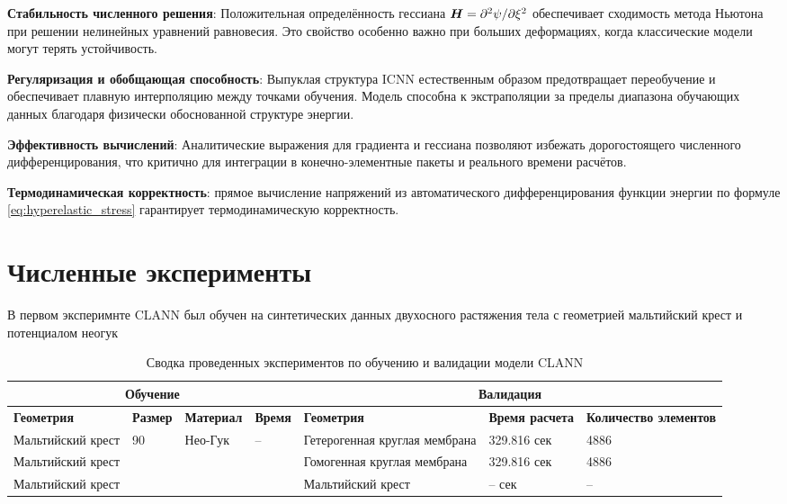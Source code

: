 \textbf{Стабильность численного решения}: Положительная определённость гессиана \(\boldsymbol{H} = \partial^2\psi/\partial\xi^2\) обеспечивает сходимость метода Ньютона при решении нелинейных уравнений равновесия. Это свойство особенно важно при больших деформациях, когда классические модели могут терять устойчивость.

\textbf{Регуляризация и обобщающая способность}: Выпуклая структура ICNN естественным образом предотвращает переобучение и обеспечивает плавную интерполяцию между точками обучения. Модель способна к экстраполяции за пределы диапазона обучающих данных благодаря физически обоснованной структуре энергии.

\textbf{Эффективность вычислений}: Аналитические выражения для градиента и гессиана позволяют избежать дорогостоящего численного дифференцирования, что критично для интеграции в конечно-элементные пакеты и реального времени расчётов.

\textbf{Термодинамическая корректность}: прямое вычисление напряжений из автоматического дифференцирования функции энергии по формуле \eqref{eq:hyperelastic_stress} гарантирует термодинамическую корректность.

\section{Численные эксперименты}

В первом эксперимнте CLANN был обучен на синтетических данных двухосного растяжения тела с геометрией мальтийский крест и потенциалом неогук 

\begin{table}[htbp]
\centering
\caption{Сводка проведенных экспериментов по обучению и валидации модели CLANN}
\label{tab:experiments_summary}
\begin{tabular}{|p{2.3cm}|p{2.2cm}|p{2.2cm}|p{1.3cm}|p{2.3cm}|p{1.5cm}|p{2.5cm}|}
\hline
\multicolumn{4}{|c|}{\textbf{Обучение}} & \multicolumn{3}{c|}{\textbf{Валидация}} \\
\hline
\textbf{Геометрия} & \textbf{Размер} & \textbf{Материал} & \textbf{Время} & \textbf{Геометрия} & \textbf{Время расчета} & \textbf{Количество элементов} \\
\hline
Мальтийский крест & 90 & Нео-Гук & -- & Гетерогенная круглая мембрана  & 329.816 сек & 4886 \\
\hline
Мальтийский крест & & & & Гомогенная круглая мембрана  & 329.816 сек & 4886  \\
\hline
Мальтийский крест & & & & Мальтийский крест & -- сек & -- \\
\hline
\end{tabular}
\end{table}

